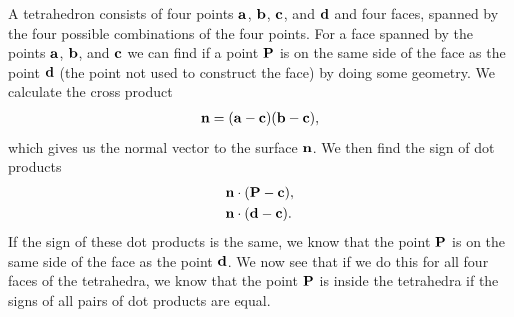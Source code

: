 A tetrahedron consists of four points $\mathbf{a}$, $\mathbf{b}$, $\mathbf{c}$, and $\mathbf{d}$ and four faces, spanned by the four possible combinations of the four points. For a face spanned by the points $\mathbf{a}$, $\mathbf{b}$, and $\mathbf{c}$ we can find if a point $\mathbf{P}$ is on the same side of the face as the point $\mathbf{d}$ (the point not used to construct the face) by doing some geometry. We calculate the cross product 
\begin{align*}
    \mathbf{n} = (\mathbf{a}-\mathbf{c})(\mathbf{b}-\mathbf{c}),
\end{align*}
which gives us the normal vector to the surface $\mathbf{n}$. We then find the sign of dot products 
\begin{align*}
    &\mathbf{n}\cdot(\mathbf{P} - \mathbf{c}), \\
    &\mathbf{n}\cdot(\mathbf{d} - \mathbf{c}).
\end{align*}
If the sign of these dot products is the same, we know that the point $\mathbf{P}$ is on the same side of the face as the point $\mathbf{d}$. We now see that if we do this for all four faces of the tetrahedra, we know that the point $\mathbf{P}$ is inside the tetrahedra if the signs of all pairs of dot products are equal.



